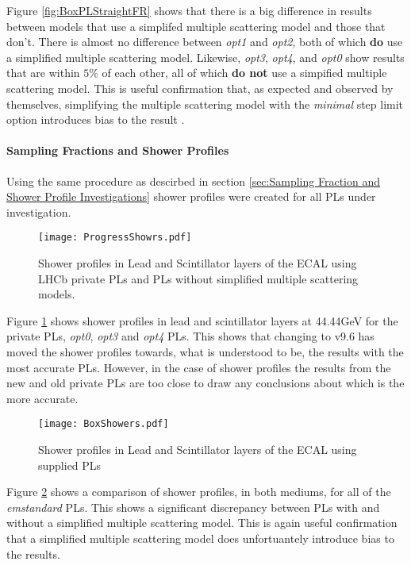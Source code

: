 Figure \ref{fig:BoxPLStraightFR} shows that there is a big difference in results between models that use a simplifed multiple scattering model and those that don't.  There is almost no difference between \textit{opt1} and \textit{opt2}, both of which \textbf{do} use a simplified multiple scattering model.  Likewise, \textit{opt3}, \textit{opt4}, and \textit{opt0} show results that are within $5\%$ of each other, all of which \textbf{do not} use a simpified multiple scattering model.  This is useful confirmation that, as expected and observed by \geant themselves, simplifying the multiple scattering model with the \textit{minimal} step limit option introduces bias to the result \cite{1742-6596-219-3-032045}.

\paragraph{Sampling Fractions and Shower Profiles} 
Using the same procedure as descirbed in section \ref{sec:Sampling Fraction and Shower Profile Investigations} shower profiles were created for all PLs under investigation.  
\begin{figure}[h]
  \centering
  \texttt{[image: ProgressShowrs.pdf]}
  \caption{Shower profiles in Lead and Scintillator layers of the ECAL using LHCb private PLs and \geant PLs without simplified multiple scattering models.}
  \label{fig:LHCbPLShowers}
\end{figure}

Figure \ref{fig:LHCbPLShowers} shows shower profiles in lead and scintillator layers at 44.44GeV for the \lhcb private PLs, \textit{opt0}, \textit{opt3} and \textit{opt4} PLs.  This shows that changing to \geant v9.6 has moved the shower profiles towards, what is understood to be, the results with the most accurate PLs.  However, in the case of shower profiles the results from the new and old \lhcb private PLs are too close to draw any conclusions about which is the more accurate.

\begin{figure}[h]
  \centering
  \texttt{[image: BoxShowers.pdf]}
  \caption{Shower profiles in Lead and Scintillator layers of the ECAL using \geant supplied PLs}
  \label{fig:BoxPLShowers}
\end{figure}

Figure \ref{fig:BoxPLShowers} shows a comparison of shower profiles, in both mediums, for all of the \textit{emstandard} PLs.  This shows a significant discrepancy between PLs with and without a simplified multiple scattering model.  This is again useful confirmation that a simplified multiple scattering model does unfortuantely introduce bias to the results.


